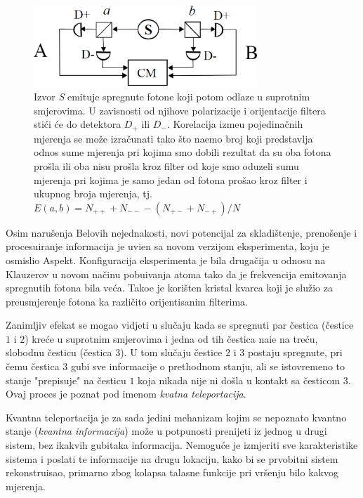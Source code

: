 \begin{figure}
    \centering
    \includegraphics[width=0.75\textwidth]{figures/chsh_scheme.eps}
    \caption{Izvor \textit{S} emituje spregnute fotone koji potom odlaze u suprotnim smjerovima. U zavisnosti od njihove polarizacije i orijentacije filtera sti\'ci \' ce do  detektora $D_+$ ili $D_-$.
    Korelacija izme\dj u pojedina\v cnih mjerenja se mo\v ze izra\v cunati tako \v sto
    na\dj emo broj koji predstavlja odnos sume mjerenja pri kojima smo dobili rezultat da su oba fotona pro\v sla ili oba nisu pro\v sla kroz filter
    od koje smo oduzeli sumu mjerenja pri kojima je samo jedan od fotona pro\v sao kroz filter i ukupnog broja mjerenja, tj.
       $E(a,b) = N_{++} + N_{--} - (N_{+-} + N_{-+})/N$}
    \label{fig:chsh_scheme}
\end{figure}

Osim naru\v senja Belovih nejednakosti, novi potencijal za skladi\v stenje, preno\v senje i procesuiranje informacija je uvi\dj en sa novom verzijom eksperimenta, koju je osmislio Aspekt.
Konfiguracija eksperimenta je bila druga\v cija  u odnosu na Klauzerov u novom na\v cinu pobu\dj ivanja atoma tako da je frekvencija emitovanja
spregnutih fotona bila ve\'ca. Tako\dj e je kori\v sten kristal kvarca koji je slu\v zio za preusmjerenje fotona ka razli\v cito orijentisanim filterima.

Zanimljiv efekat se mogao vidjeti u slu\v caju kada se spregnuti par \v cestica (\v cestice $1$ i $2$) kre\' ce u suprotnim smjerovima i jedna od tih \v cestica nai\dj e na tre\'cu, slobodnu \v cesticu (\v cestica $3$).
U tom slu\v caju \v cestice $2$ i $3$ postaju spregnute, pri čemu \v cestica $3$ gubi sve informacije o prethodnom stanju, ali se istovremeno to stanje "prepisuje" na \v cesticu $1$ koja
nikada nije ni do\v sla u kontakt sa \v cesticom $3$. Ovaj proces je poznat pod imenom \textit{kvatna teleportacija}.

Kvantna teleportacija je za sada jedini mehanizam kojim se nepoznato kvantno stanje (\textit{kvantna informacija}) mo\v ze u potpunosti prenijeti iz jednog u drugi sistem,
bez ikakvih gubitaka informacija. Nemogu\'ce je izmjeriti sve karakteristike sistema i poslati te informacije na drugu lokaciju, kako bi se
prvobitni sistem rekonstruisao, primarno zbog kolapsa talasne funkcije pri vr\v senju bilo kakvog mjerenja.

